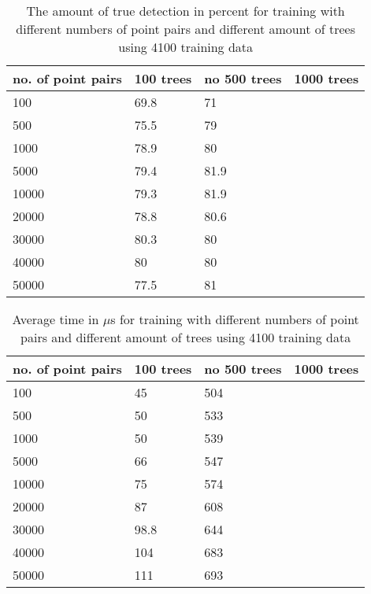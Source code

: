 \begin{table}[H]
\begin{center}
     \begin{tabular}{ | l | l | l | l | }
     \hline
     no. of point pairs & 100 trees & no 500 trees & 1000 trees \\ \hline
   	 100 & 69.8 & 71 &  	\\ \hline
     500 & 75.5 & 79 &  	\\ \hline
     1000 & 78.9 & 80 &  \\ \hline
     5000 & 79.4 & 81.9 & 	\\ \hline
     10000 & 79.3 & 81.9 & 	\\ \hline
     20000 & 78.8 & 80.6 & 	\\ \hline
     30000 & 80.3 & 80   & 	\\ \hline
     40000 & 80 &   80  & 	\\ \hline
     50000 & 77.5 &  81   & 	\\ \hline
     \end{tabular}
\end{center}
\caption{The amount of true detection in percent for training with different numbers of point pairs and different amount of trees using 4100 training data}
\end{table}

\begin{table}[H]
\begin{center}
     \begin{tabular}{ | l | l | l | l | }
     \hline
     no. of point pairs & 100 trees & no 500 trees & 1000 trees \\ \hline
   	 100 & 45 & 504 &  	\\ \hline
     500 & 50 & 533 &  	\\ \hline
     1000 & 50 & 539 &  \\ \hline
     5000 & 66 & 547 & 	\\ \hline
     10000 & 75 & 574 & 	\\ \hline
     20000 & 87 &  608  & 	\\ \hline
     30000 & 98.8 &  644  & 	\\ \hline
     40000 & 104 &  683  & 	\\ \hline
     50000 & 111 &  693  & 	\\ \hline
     \end{tabular}
\end{center}
\caption{Average time in $\mu$s for training with different numbers of point pairs and different amount of trees using 4100 training data}
\end{table}

